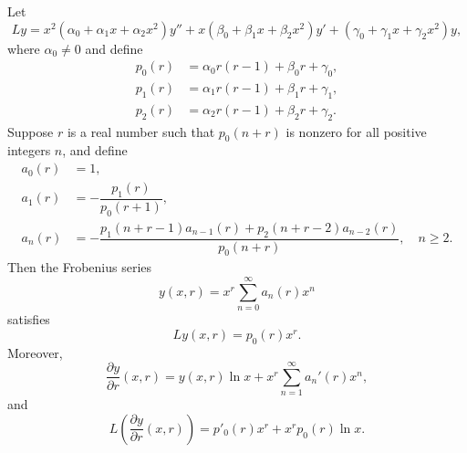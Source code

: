 \begin{theorem}\label{thmtype:7.6.1}
Let
\begin{equation} \label{eq:7.6.2}
Ly=
x^2(\alpha_0+\alpha_1x+\alpha_2x^2)y''+x(\beta_0+\beta_1x+\beta_2x^2)y'
+(\gamma_0+\gamma_1x+\gamma_2x^2)y,
\end{equation}
where $\alpha_0\ne0$ and define
\begin{align*}
p_0(r)&=\alpha_0r(r-1)+\beta_0r+\gamma_0,\\
p_1(r)&=\alpha_1r(r-1)+\beta_1r+\gamma_1,\\
p_2(r)&=\alpha_2r(r-1)+\beta_2r+\gamma_2.
\end{align*}
Suppose $r$ is
a real number such that $p_0(n+r)$ is nonzero
for all positive integers $n$, and define
\begin{align*}
a_0(r)&=1,\\
a_1(r)&=-\dfrac{p_1(r)}{p_0(r+1)},\\
a_n(r)&=-\dfrac{p_1(n+r-1)a_{n-1}(r)+p_2(n+r-2)a_{n-2}(r)}{p_0(n+r)},\quad n\ge2.
\end{align*}
Then the Frobenius series
\begin{equation} \label{eq:7.6.3}
y(x,r)=x^r\sum_{n=0}^\infty a_n(r)x^n
\end{equation}
satisfies
\begin{equation} \label{eq:7.6.4}
Ly(x,r)=p_0(r)x^r.
\end{equation}
Moreover,
\begin{equation} \label{eq:7.6.5}
\frac{\partial y}{\partial r}(x,r)=y(x,r)\ln x+x^r\sum_{n=1}^\infty
a_n'(r) x^n,
\end{equation}
and
\begin{equation} \label{eq:7.6.6}
L\left(\frac{\partial y}{\partial
r}(x,r)\right)=p'_0(r)x^r+x^rp_0(r)\ln x.
\end{equation}
\end{theorem}

